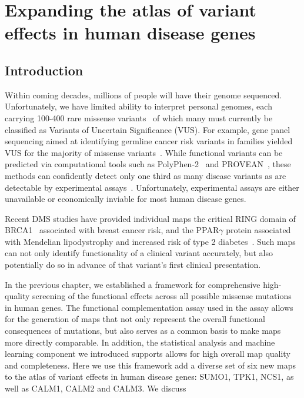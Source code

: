 
\chapter[Expanding the atlas of human disease variants]{Expanding the atlas of variant effects in human disease genes}

\section{Introduction}

Within coming decades, millions of people will have their genome sequenced. Unfortunately, we have limited ability to interpret personal genomes, each carrying 100-400 rare missense variants~\cite{the_1000_genomes_project_consortium_global_2015} of which many must currently be classified as Variants of Uncertain Significance (VUS). For example, gene panel sequencing aimed at identifying germline cancer risk variants in families yielded VUS for the majority of missense variants~\cite{maxwell_evaluation_2016}. While functional variants can be predicted via computational tools such as PolyPhen-2~\cite{adzhubei_predicting_2001} and PROVEAN~\cite{choi_predicting_2012}, these methods can confidently detect only one third as many disease variants as are detectable by experimental assays~\cite{sun_extended_2016}. Unfortunately, experimental assays are either unavailable or economically inviable for most human disease genes. 

Recent DMS studies have provided individual maps the critical RING domain of BRCA1~\cite{starita_massively_2015} associated with breast cancer risk, and the PPAR$\gamma$ protein associated with Mendelian lipodystrophy and increased risk of type 2 diabetes~\cite{majithia_prospective_2016}. Such maps can not only identify functionality of a clinical variant accurately, but also potentially do so in advance of that variant's first clinical presentation. 

In the previous chapter, we established a framework for comprehensive high-quality screening of the functional effects across all possible missense mutations in human genes. The functional complementation assay used in the assay allows for the generation of maps that not only represent the overall functional consequences of mutations, but also serves as a common basis to make maps more directly comparable. In addition, the statistical analysis and machine learning component we introduced supports allows for high overall map quality and completeness. Here we use this framework add a diverse set of six new maps to the atlas of variant effects in human disease genes: SUMO1, TPK1, NCS1, as well as CALM1, CALM2 and CALM3. We discuss 

